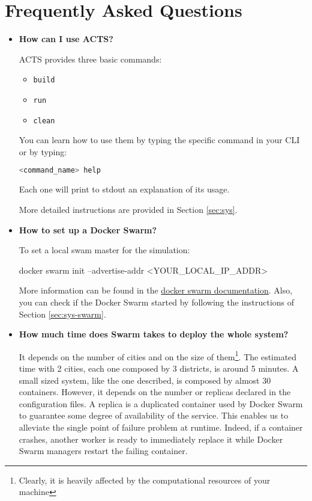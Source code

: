\section{Frequently Asked Questions}

\begin{itemize}

\item \textbf{How can I use ACTS?}

ACTS provides three basic commands:
\begin{itemize}
	\item \texttt{build}
	\item \texttt{run}
	\item \texttt{clean}
\end{itemize}
You can learn how to use them by typing the specific command in your CLI or
by typing:
\begin{lstlisting}[language=bash]
<command_name> help
\end{lstlisting}
Each one will print to stdout an explanation of its usage.

More detailed instructions are provided in Section \ref{sec:sys}.

\item \textbf{How to set up a Docker Swarm?}

To set a local swam master for the simulation:

docker swarm init --advertise-addr <YOUR\_LOCAL\_IP\_ADDR>

More information can be found in the \href{https://docs.docker.com/engine/swarm/swarm-tutorial/create-swarm/}{docker swarm documentation}.
Also, you can check if the Docker Swarm started by following the instructions
of Section \ref{sec:sys-swarm}.

\item \textbf{How much time does Swarm takes to deploy the whole system?}

It depends on the number of cities and on the size of them\footnote{Clearly,
it is heavily affected by the computational resources of your machine}.
The estimated time with 2 cities, each one
composed by 3 districts, is around 5 minutes.
A small sized system, like
the one described, is composed by almost 30 containers.
However, it depends on the number or replicas declared in the configuration
files.
A replica is a duplicated container used by Docker Swarm to guarantee some
degree of availability of the service. This enables us to alleviate the single
point of failure problem at runtime. Indeed, if a container crashes, another
worker is ready to immediately replace it while Docker Swarm managers restart
the failing container.

\end{itemize}
